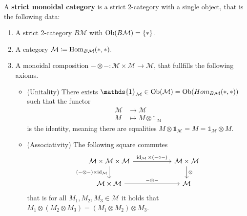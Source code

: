 \begin{defi}
\label{strict_moindal_cat_defi}
	A \textbf{strict monoidal category} is a strict 2-category with a single object, that is the following data:
	\begin{enumerate}
		\item 
		A strict 2-category $B \mathcal{ M }$ with $\operatorname{Ob} ( B \mathcal{ M } ) = \{ * \} $.
		
		\item 
		A category $ \mathcal{ M } \coloneqq \operatorname{Hom}_{ B \mathcal{ M }  } ( * , * ). $
		
		\item 
		A monoidal composition $ - \otimes - \colon \mathcal{ M } \times \mathcal{ M } \to \mathcal{ M } $, that fullfills 
		the following axioms.
		
		\begin{itemize}
			\item 
			(Unitality)
			There exists $ \mathds{ 1 }_{ \mathcal{ M } } \in \Ob( \mathcal{ M } ) = \Ob ( Hom_{ B \mathcal{M} } ( * , * ) )$ such that the functor 
			\begin{align*}
				\mathcal{ M } 
				& \to
				\mathcal{ M }
				\\
				M
				&\mapsto 
				M \otimes \mathds{ 1 }_{ \mathcal{ M } }
			\end{align*}
			is the identity, meaning there are equalities $ M \otimes  \mathds{ 1 }_{ \mathcal{ M } } = M = \mathds{ 1 }_{ \mathcal{ M } } \otimes M $.
			
			\item 
			(Associativity)
			The following square commutes
			\[
			\begin{tikzcd}[column sep = 2cm]
				\mathcal{ M } \times \mathcal{ M } \times  \mathcal{ M }
				\ar[r, " \id_{ \mathcal{ M } } \times  ( - \circ - ) "]
				\ar[d, " ( - \otimes - ) \times \id_{ \mathcal{ M } } "']
				&
				\mathcal{ M  } \times \mathcal{ M }
				\ar[d, "\otimes "]
				\\
				\mathcal{ M } \times \mathcal{ M }
				\ar[r, " - \otimes - " ]
				&
				\mathcal{ M } 
			\end{tikzcd}
			\]
			that is for all $ M_1 , M_2 , M_3 \in \mathcal{ M } $ 
			it holds that $ M_1 \otimes  ( M_2 \otimes M_3 ) = ( M_1 \otimes M_2 ) \otimes M_3 $.
		\end{itemize}
	\end{enumerate}		
\end{defi}

